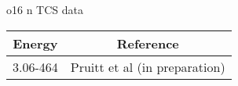 \caption{o16 n TCS data}\begin{tabular}{|c||c|} 
 \hline 
\bf{Energy} & \bf{Reference} \\
 \hline
 \hline 
3.06-464 & Pruitt et al (in preparation)\\
\end{tabular}
